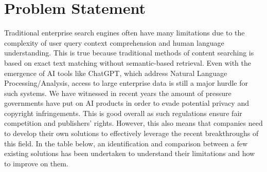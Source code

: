 \section{Problem Statement}
Traditional enterprise search engines often have many limitations due to the complexity of user query context comprehension and human language understanding. This is true because traditional methods of content searching is based on exact text matching without semantic-based retrieval. Even with the emergence of AI tools like ChatGPT, which address Natural Language Processing/Analysis, access to large enterprise data is still a major hurdle for such systems. We have witnessed in recent years the amount of pressure governments have put on AI products in order to evade potential privacy and copyright infringements. This is good overall as such regulations ensure fair competition and publishers' rights. However, this also means that companies need to develop their own solutions to effectively leverage the recent breakthroughs of this field.\medskip\newline
In the table below, an identification and comparison between a few existing solutions has been undertaken to understand their limitations and how to improve on them.
